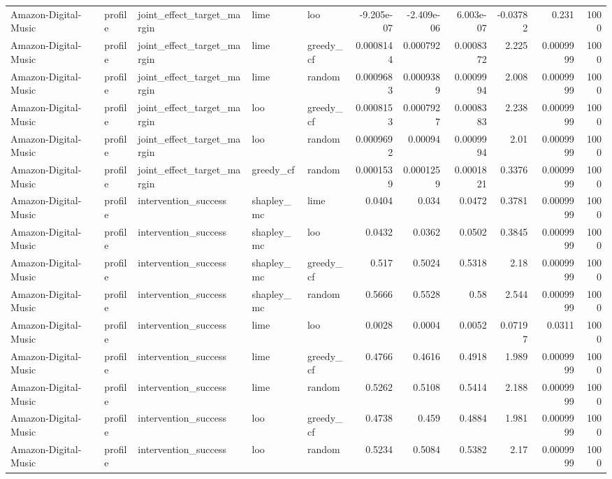 \begin{table}[t]
\begin{tabular}{lllllrrrrrr}
Amazon-Digital-Music & profile & joint\_effect\_target\_margin & lime & loo & -9.205e-07 & -2.409e-06 & 6.003e-07 & -0.03782 & 0.231 & 1000 \\
Amazon-Digital-Music & profile & joint\_effect\_target\_margin & lime & greedy\_cf & 0.0008144 & 0.000792 & 0.0008372 & 2.225 & 0.0009999 & 1000 \\
Amazon-Digital-Music & profile & joint\_effect\_target\_margin & lime & random & 0.0009683 & 0.0009389 & 0.0009994 & 2.008 & 0.0009999 & 1000 \\
Amazon-Digital-Music & profile & joint\_effect\_target\_margin & loo & greedy\_cf & 0.0008153 & 0.0007927 & 0.0008383 & 2.238 & 0.0009999 & 1000 \\
Amazon-Digital-Music & profile & joint\_effect\_target\_margin & loo & random & 0.0009692 & 0.00094 & 0.0009994 & 2.01 & 0.0009999 & 1000 \\
Amazon-Digital-Music & profile & joint\_effect\_target\_margin & greedy\_cf & random & 0.0001539 & 0.0001259 & 0.0001821 & 0.3376 & 0.0009999 & 1000 \\
Amazon-Digital-Music & profile & intervention\_success & shapley\_mc & lime & 0.0404 & 0.034 & 0.0472 & 0.3781 & 0.0009999 & 1000 \\
Amazon-Digital-Music & profile & intervention\_success & shapley\_mc & loo & 0.0432 & 0.0362 & 0.0502 & 0.3845 & 0.0009999 & 1000 \\
Amazon-Digital-Music & profile & intervention\_success & shapley\_mc & greedy\_cf & 0.517 & 0.5024 & 0.5318 & 2.18 & 0.0009999 & 1000 \\
Amazon-Digital-Music & profile & intervention\_success & shapley\_mc & random & 0.5666 & 0.5528 & 0.58 & 2.544 & 0.0009999 & 1000 \\
Amazon-Digital-Music & profile & intervention\_success & lime & loo & 0.0028 & 0.0004 & 0.0052 & 0.07197 & 0.0311 & 1000 \\
Amazon-Digital-Music & profile & intervention\_success & lime & greedy\_cf & 0.4766 & 0.4616 & 0.4918 & 1.989 & 0.0009999 & 1000 \\
Amazon-Digital-Music & profile & intervention\_success & lime & random & 0.5262 & 0.5108 & 0.5414 & 2.188 & 0.0009999 & 1000 \\
Amazon-Digital-Music & profile & intervention\_success & loo & greedy\_cf & 0.4738 & 0.459 & 0.4884 & 1.981 & 0.0009999 & 1000 \\
Amazon-Digital-Music & profile & intervention\_success & loo & random & 0.5234 & 0.5084 & 0.5382 & 2.17 & 0.0009999 & 1000 \\

\end{tabular}
\end{table}

